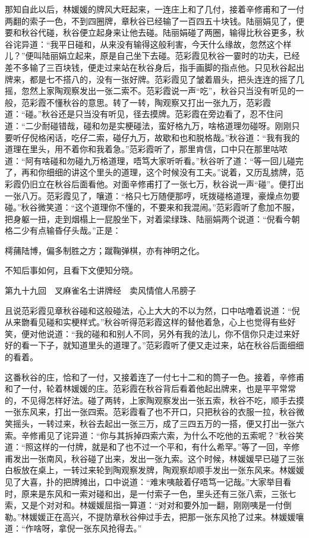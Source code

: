 \documentclass[12pt,UTF8]{ctexbook}
\begin{document}
{{{那知自此以后，林媛媛的牌风大旺起来，一连庄上和了几付，接着辛修甫和了一付两翻的索子一色，不到四圈牌，章秋谷已经输了一百四五十块钱。陆丽娟见了，便要和秋谷代碰，秋谷便立起身来让他去碰。陆丽娟碰了两圈，输得比秋谷更多，秋谷诧异道：“我平日碰和，从来没有输得这般利害，今天什么缘故，忽然这个样儿？”便叫陆丽娟立起来，原是自己坐下去碰。范彩霞见秋谷一霎时的功夫，已经差不多输了三百块钱，便走过来站在秋谷身后，指手画脚的指点他。只见秋谷起出牌来，都是七不搭八的，没有一张好牌。范彩霞见了皱着眉头，把头连连的摇了几摇，忽然上家陶观察发出一张二索不。范彩霞说一声“吃”，秋谷只当没有听见的一般，范彩霞不懂秋谷的意思。转了一转，陶观察又打出一张九万，范彩霞道：“碰。”秋谷还是只当没有听见，径去摸牌。范彩霞在旁边看了，忍不住问道：“二少耐碰错哉，碰和勿是实梗碰法，蛮好格九万，啥格道理勿碰呀。刚刚只要听仔倪格闲话，吃仔二索，碰仔九万，故歇和也和脱格哉。”秋谷道：“我有我的道理在里头，用不着你和我着急。”范彩霞听了，那里肯信，口中只在那里咕哝道：“阿有啥碰和勿碰九万格道理，唔笃大家听听看。”秋谷听了道：“等一回儿碰完了，再和你细细的讲这个里头的道理，这个时候没有工夫。”说着，又历乱掳牌，范彩霞仍旧立在秋谷后面看他。对面辛修甫打了一张七万，秋谷说一声“碰”。便打出一张八万。范彩霞见了，嚷道：“格只七万随便那哼，呒拨碰格道理，豪燥点勿要碰。”秋谷微笑道：“这个道理你不懂的，不要来和我混闹。”范彩霞听了愈加不服，把身躯一扭，走到烟榻上一屁股坐下，对着梁绿珠、陆丽娟两个说道：“倪看今朝格二少有点输昏仔头哉。”正是：

樗蒱陆博，偏多制胜之方；蹴鞠弹棋，亦有神明之化。

不知后事如何，且看下文便知分晓。





第九十九回　叉麻雀名士讲牌经　卖风情倌人吊膀子





且说范彩霞见章秋谷碰和这般碰法，心上大大的不以为然，口中咕噜着说道：“倪从来朆看见碰和实梗样式。”秋谷听得范彩霞这样的替他着急，心上也觉得有些好笑，便对他说道：“我的碰和和别人不同，另外有我的法儿，你不信你只走过来好好的看一下子，就知道里头的道理了。”范彩霞听了便又走过来，站在秋谷后面细细的看着。

这番秋谷的庄，恰和了一付，又接着连了一付七十二和的筒子一色。接着，辛修甫和了一付，轮着林媛媛的庄。范彩霞在秋谷背后看着他起出牌来，也是平平常常的，不见得怎样好法。碰了两转，上家陶观察发出一张五索，秋谷不吃，顺手去摸一张东风来，打出一张四索。范彩霞看了也不开口，只把秋谷的衣服一拉，秋谷微笑摇头，一转过来，秋谷去起出一张三万，成了三四五万的一搭，便又打出一张六索。辛修甫见了诧异道：“你与其拆掉四索六索，为什么不吃他的五索呢？”秋谷笑道：“照这样的一付牌，就是和了也不过一个平和，有什么希罕。”等了一回，辛修甫发出一张南风，秋谷碰了出来，发出一张九索。这个时候，林媛媛早已碰了三张白板放在桌上，一转过来轮到陶观察发牌，陶观察却顺手发出一张东风来。林媛媛见了大喜，扑的把牌摊出，口中说道：“难末咦敲着仔唔笃一记哉。”大家举目看时，原来是东风和一索对碰和出，是一付索子一色，里头还有三张八索，三张七索，又是个对对和。林媛媛屈指一算道：“对对和要外加一翻，刚刚咦是一付倒勒。”林媛媛正在高兴，不提防章秋谷伸过手去，把那一张东风抢了过来。林媛媛嚷道：“作啥呀，拿倪一张东风抢得去。”

}}}
\end{document}
